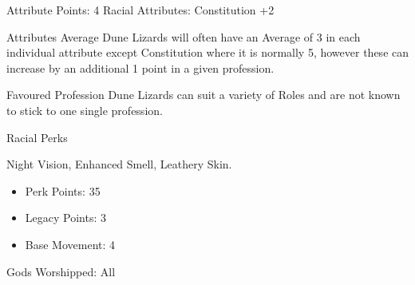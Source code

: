 \begin{multicols}{2}
Attribute Points: 4
Racial Attributes: Constitution +2

Attributes Average
Dune Lizards will often have an Average of 3 in each individual attribute except Constitution where it is normally 5, however these can increase by an additional 1 point in a given profession.

Favoured Profession
Dune Lizards can suit a variety of Roles and are not known to stick to one single profession.

Racial Perks

Night Vision, Enhanced Smell, Leathery Skin.
\begin{itemize}
\item Perk Points: 35
\item Legacy Points: 3
\item Base Movement: 4
\end{itemize}

Gods Worshipped: All
\end{multicols}